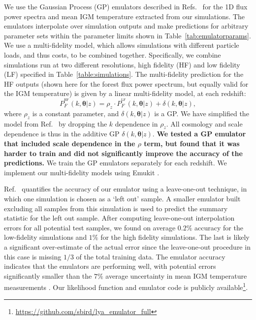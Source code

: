 We use the Gaussian Process (GP) emulators described in Refs.~\cite{2022MNRAS.517.3200F, 2023simsuite} for the 1D flux power spectra and mean IGM temperature extracted from our simulations.
The emulators interpolate over simulation outputs and make predictions for arbitrary parameter sets within the parameter limits shown in Table~\ref{tab:emulatorparams}.
We use a multi-fidelity model, which allows simulations with different particle loads, and thus costs, to be combined together.
Specifically, we combine simulations run at two different resolutions, high fidelity (HF) and low fidelity (LF) specified in Table~\ref{table:simulations}. 
The multi-fidelity prediction for the HF outputs (shown here for the \lya forest flux power spectrum, but equally valid for the IGM temperature) is given by a linear multi-fidelity model, at each redshift:
\begin{equation}
    P_F^{^\mathrm{HF}}(k, \boldsymbol{\theta} | z) = \rho_z \cdot P_F^{^\mathrm{LF}}(k, \boldsymbol{\theta} | z) + \delta(k, \boldsymbol{\theta} | z),
    \label{eq:ko_model}
\end{equation}
where $\rho_z$ is a constant parameter, and $\delta(k, \boldsymbol{\theta} | z)$ is a GP.
We have simplified the model from Ref.~\cite{2022MNRAS.517.3200F} by dropping the $k$ dependence in $\rho_z$.
All cosmology and scale dependence is thus in the additive GP $\delta(k, \boldsymbol{\theta} | z)$.
\textbf{We tested a GP emulator that included scale dependence in the $\rho$ term, but found that it was harder to train and did not significantly improve the accuracy of the predictions.}
We train the GP emulators separately for each redshift. We implement our multi-fidelity models using Emukit \cite{2021arXiv211013293P}.

Ref.~\cite{2023simsuite} quantifies the accuracy of our emulator using a leave-one-out technique, in which one simulation is chosen as a `left out' sample.
A smaller emulator built excluding all samples from this simulation is used to predict the summary statistic for the left out sample.
After computing leave-one-out interpolation errors for all potential test samples, we found on average $0.2\%$ accuracy for the low-fidelity simulations and $1\%$ for the high fidelity simulations.
The last is likely a significant over-estimate of the actual error since the leave-one-out procedure in this case is missing $1/3$ of the total training data.
The emulator accuracy indicates that the emulators are performing well, with potential errors significantly smaller than the $7\%$ average uncertainty in mean IGM temperature measurements \cite{2019JCAP...07..017C}.
Our likelihood function and emulator code is publicly available\footnote{\url{https://github.com/sbird/lya_emulator_full}}.


